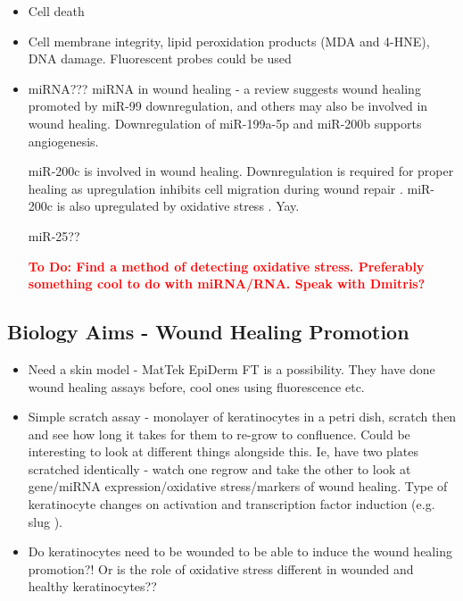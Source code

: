 \documentclass[11pt, oneside]{article}   	%
\newcommand{\todo}[1]{ \textcolor{red}{\bf{To Do:} #1}}
\begin{document}
\begin{itemize}
\item Cell death
\item Cell membrane integrity, lipid peroxidation products (MDA and 4-HNE), DNA damage. Fluorescent probes could be used \cite{Ayala2014lipid, Joshi2011nonthermal, Joshi2010control}
\item miRNA???
miRNA in wound healing \cite{Riemondy2014not} - a review suggests wound healing promoted by miR-99 downregulation, and others may also be involved in wound healing. Downregulation of miR-199a-5p and miR-200b supports angiogenesis.

miR-200c is involved in wound healing. Downregulation is required for proper healing as upregulation inhibits cell migration during wound repair  \cite{Aunin2017exploring}. 
miR-200c is also upregulated by oxidative stress \cite{Magenta2011miR}. Yay.

miR-25??

\todo{Find a method of detecting oxidative stress. Preferably something cool to do with miRNA/RNA. Speak with Dmitris?}
\end{itemize}


\subsection{Biology Aims - Wound Healing Promotion}

\begin{itemize}
\item Need a skin model - MatTek EpiDerm FT \cite{MattekWebsite} is a possibility. They have done wound healing assays before, cool ones using fluorescence etc.
\item Simple scratch assay - monolayer of keratinocytes in a petri dish, scratch then and see how long it takes for them to re-grow to confluence. Could be interesting to look at different things alongside this. Ie, have two plates scratched identically - watch one regrow and take the other to look at gene/miRNA expression/oxidative stress/markers of wound healing. Type of keratinocyte changes on activation \cite{Pastar2014epithelialization} and transcription factor induction (e.g. slug \cite{Savagner2005developmental}).
\item Do keratinocytes need to be wounded to be able to induce the wound healing promotion?! Or is the role of oxidative stress different in wounded and healthy keratinocytes??
\end{itemize}
\end{document}
